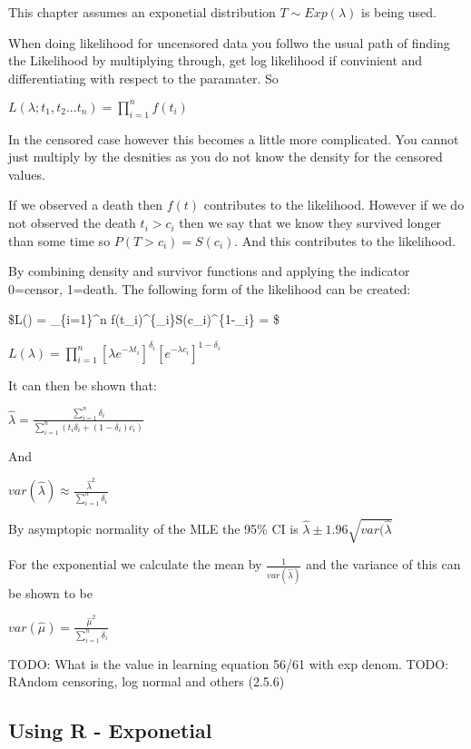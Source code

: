 \documentclass[
  letterpaper,
  DIV=11,
  numbers=noendperiod]{scrreprt}
\begin{document}
This chapter assumes an exponetial distribution \(T \sim Exp(\lambda)\)
is being used.

When doing likelihood for uncensored data you follwo the usual path of
finding the Likelihood by multiplying through, get log likelihood if
convinient and differentiating with respect to the paramater. So

\(L(\lambda ; t_1, t_2 ... t_n) = \prod^n_{i=1}f(t_i)\)

In the censored case however this becomes a little more complicated. You
cannot just multiply by the desnities as you do not know the density for
the censored values.

If we observed a death then \(f(t)\) contributes to the likelihood.
However if we do not observed the death \(t_i > c_i\) then we say that
we know they survived longer than some time so \(P(T > c_i) = S(c_i)\).
And this contributes to the likelihood.

By combining density and survivor functions and applying the indicator
0=censor, 1=death. The following form of the likelihood can be created:

\$L(\lambda) = \prod\_\{i=1\}\^{}n
f(t\_i)\^{}\{\delta\_i\}S(c\_i)\^{}\{1-\delta\_i\} = \$

\(L(\lambda) = \prod_{i=1}^n [\lambda e^{-\lambda t_i}]^{\delta_i}[e^{-\lambda c_i}]^{1-\delta_i}\)

It can then be shown that:

\(\hat{\lambda} = \frac{\sum^n_{i=1} \delta_i}{\sum^n_{i=1}(t_i\delta_i +(1-\delta_i)c_i)}\)

And

\(var(\hat{\lambda}) \approx \frac{\hat{\lambda}^2}{\sum^n_{i=1} \delta_i}\)

By asymptopic normality of the MLE the 95\% CI is
\(\hat{\lambda}\pm 1.96\sqrt{var(\hat{\lambda}}\)

For the exponential we calculate the mean by
\(\frac{1}{var(\hat{\lambda})}\) and the variance of this can be shown
to be

\(var(\hat{\mu}) = \frac{\hat{\mu}^2}{\sum_{i=1}^n \delta_i}\)

TODO: What is the value in learning equation 56/61 with exp denom. TODO:
RAndom censoring, log normal and others (2.5.6)

\hypertarget{using-r---exponetial}{%
\subsection{Using R - Exponetial}\label{using-r---exponetial}}
\end{document}
